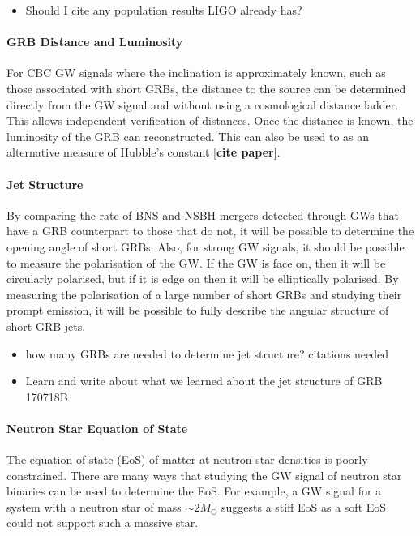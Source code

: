 \documentclass[11pt]{cuthesis}
\begin{document}
\begin{itemize}
\item Should I cite any population results LIGO already has?
\end{itemize}

\paragraph{GRB Distance and Luminosity}
For CBC GW signals where the inclination is approximately known, such as those associated with short GRBs, the distance to the source can be determined directly from the GW signal and without using a cosmological distance ladder. This allows independent verification of distances. Once the distance is known, the luminosity of the GRB can reconstructed. This can also be used to as an alternative measure of Hubble's constant [\textbf{cite paper}]. 

\paragraph{Jet Structure}
By comparing the rate of BNS and NSBH mergers detected through GWs that have a GRB counterpart to those that do not, it will be possible to determine the opening angle of short GRBs. Also, for strong GW signals, it should be possible to measure the polarisation of the GW. If the GW is face on, then it will be circularly polarised, but if it is edge on then it will be elliptically polarised. By measuring the polarisation of a large number of short GRBs and studying their prompt emission, it will be possible to fully describe the angular structure of short GRB jets. 
\begin{itemize}
\item how many GRBs are needed to determine jet structure? citations needed
\item Learn and write about what we learned about the jet structure of GRB 170718B
\end{itemize}

\paragraph{Neutron Star Equation of State}
The equation of state (EoS) of matter at neutron star densities is poorly constrained. There are many ways that studying the GW signal of neutron star binaries can be used to determine the EoS. For example, a GW signal for a system with a neutron star of mass $\sim 2M_\odot$ suggests a stiff EoS as a soft EoS could not support such a massive star. 
\end{document}
